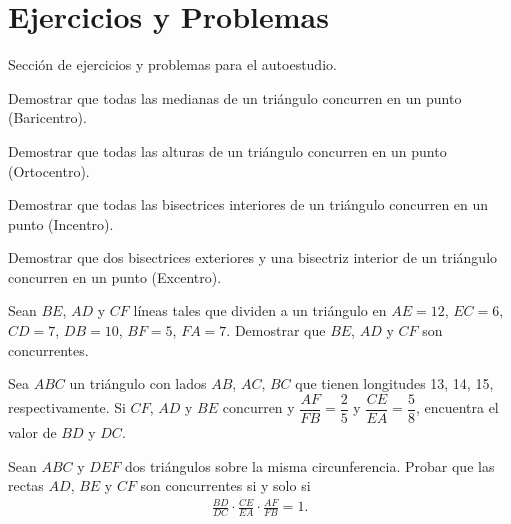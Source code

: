 \section{Ejercicios y Problemas}
{
    Sección de ejercicios y problemas para el autoestudio.

    \begin{exercise}
        Demostrar que todas las medianas de un triángulo concurren en un punto (Baricentro).
    \end{exercise}

    \begin{exercise}
        Demostrar que todas las alturas de un triángulo concurren en un punto (Ortocentro).
    \end{exercise}

    \begin{exercise}
        Demostrar que todas las bisectrices interiores de un triángulo concurren en un punto (Incentro).
    \end{exercise}

    \begin{exercise}
        Demostrar que dos bisectrices exteriores y una bisectriz interior de un triángulo concurren en un punto (Excentro).
    \end{exercise}

    \begin{exercise}
        Sean $BE$, $AD$ y $CF$ líneas tales que dividen a un triángulo en $AE = 12$, $EC = 6$, $CD = 7$, $DB = 10$, $BF = 5$, $FA = 7$.
        Demostrar que $BE$, $AD$ y $CF$ son concurrentes.
    \end{exercise}

    \begin{exercise}
        Sea $ABC$ un triángulo con lados $AB$, $AC$, $BC$ que tienen longitudes 13, 14, 15, respectivamente.
        Si $CF$, $AD$ y $BE$ concurren y $\dfrac{AF}{FB} = \dfrac{2}{5}$ y $\dfrac{CE}{EA} = \dfrac{5}{8}$, encuentra el valor de $BD$ y $DC$.
    \end{exercise}

    \begin{exercise}
        Sean $ABC$ y $DEF$ dos triángulos sobre la misma circunferencia.
        Probar que las rectas $AD$, $BE$ y $CF$ son concurrentes si y solo si
        \begin{gather*}
            \frac{BD}{DC} \cdot \frac{CE}{EA} \cdot \frac{AF}{FB} = 1.
        \end{gather*}
    \end{exercise}
}